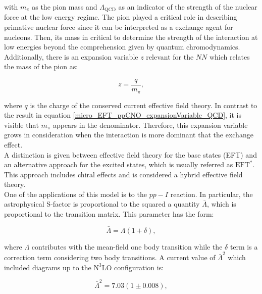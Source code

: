 \documentclass[openany]{book}
\begin{document}
with $m_\pi$ as the pion mass and $\Lambda_{\mathrm{QCD}}$ as an indicator of the strength of the nuclear force at the low energy regime. The pion played a critical role in describing primative nuclear force since it can be interpreted as a exchange agent for nucleons. Then, its mass in critical to determine the strength of the interaction at low energies beyond the comprehension given by quantum chromodynamics. \\

Additionally, there is an expansion variable $z$ relevant for the $NN$ which relates the mass of the pion as: 

 \begin{equation}\label{micro_EFT_ppCNO_expansionVariable_2}
	z = \frac{q}{m_\pi},
\end{equation}

where $q$ is the charge of the conserved current effective field theory. In contrast to the result in equation \ref{micro_EFT_ppCNO_expansionVariable_QCD}, it is visible that $m_\pi$ appears in the denominator. Therefore, this expansion variable grows in consideration when the interaction is more dominant that the exchange effect. \\

A distinction is given between effective field theory for the base states (EFT) and an alternative approach for the excited states, which is usually referred as $\mathrm{EFT}^{*}$. This approach includes chiral effects and is considered a hybrid effective field theory.  \\

One of the applications of this model is to the $pp-I$ reaction. In particular, the astrophysical S-factor is proportional to the squared a quantity $\bar \Lambda $, which is proportional to the transition matrix. This parameter has the form: 

\begin{equation}\label{micro_EFT_ppCNO_Lambda}
	\bar\Lambda  = \Lambda (1 + \delta),
\end{equation}

where $\Lambda$ contributes with the mean-field one body transition while the $\delta$ term is a correction term considering two body transitions. A current value of $\bar \Lambda^2$ which included diagrams up to the $\mathrm{N^3LO}$ configuration is: 

\begin{equation}\label{micro_EFT_ppCNO_Lambda_estimation}
 	\bar \Lambda^2 = 7.03(1 \pm 0.008),
 \end{equation}
\end{document}
